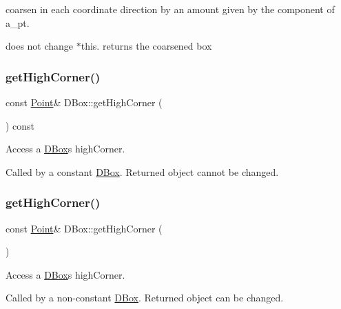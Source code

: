 coarsen in each coordinate direction by an amount given by the component of a\+\_\+pt. 

does not change $\ast$this. returns the coarsened box \mbox{\label{class_d_box_ab86dcdb4cc7e04d2d2b4208d53d8b446}} 
\subsubsection{\texorpdfstring{get\+High\+Corner()}{getHighCorner()}\hspace{0.1cm}{\footnotesize\ttfamily [1/2]}}
{\footnotesize\ttfamily const \hyperlink{class_point}{Point}\& D\+Box\+::get\+High\+Corner (\begin{DoxyParamCaption}{ }\end{DoxyParamCaption}) const\hspace{0.3cm}{\ttfamily [inline]}}



Access a \hyperlink{class_d_box}{D\+Box}\textquotesingle{}s high\+Corner. 

Called by a constant \hyperlink{class_d_box}{D\+Box}. Returned object cannot be changed. \mbox{\label{class_d_box_a6737c8ca1c7b13a6a08e9488ae05dff9}} 
\subsubsection{\texorpdfstring{get\+High\+Corner()}{getHighCorner()}\hspace{0.1cm}{\footnotesize\ttfamily [2/2]}}
{\footnotesize\ttfamily const \hyperlink{class_point}{Point}\& D\+Box\+::get\+High\+Corner (\begin{DoxyParamCaption}{ }\end{DoxyParamCaption})\hspace{0.3cm}{\ttfamily [inline]}}



Access a \hyperlink{class_d_box}{D\+Box}\textquotesingle{}s high\+Corner. 

Called by a non-\/constant \hyperlink{class_d_box}{D\+Box}. Returned object can be changed. \mbox{\label{class_d_box_a396f1e736d888714c2016307511427e1}} 
